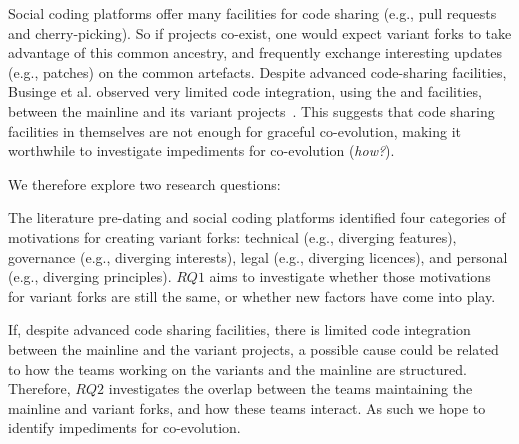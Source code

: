 Social coding platforms offer many facilities for code sharing (e.g., pull requests and cherry-picking).
So if projects co-exist, one would expect variant forks to take advantage of this common ancestry, and frequently exchange interesting updates (e.g., patches) on the common artefacts.
Despite advanced code-sharing facilities, Businge et al. observed very limited code integration, using the \git and \gh facilities, between the mainline and its variant projects~\cite{businge:emse:2021}.
This suggests that code sharing facilities in themselves are not enough for graceful co-evolution, making it worthwhile to investigate impediments for co-evolution (\textit{how?}).


\noindent
We therefore explore two research questions:

\textit{\textbf{\RQOne}}
The literature pre-dating \git and social coding platforms identified four categories of motivations for creating variant forks: technical (e.g., diverging features), governance (e.g., diverging interests), legal (e.g., diverging licences), and personal (e.g., diverging principles).
$RQ1$ aims to investigate whether those motivations for variant forks are still the same, or whether new factors have come into play. 

\textit{\textbf{\RQTwo}}
If, despite advanced code sharing facilities, there is limited code integration between the mainline and the variant projects, a possible cause could be related to how the teams working on the variants and the mainline are structured.
Therefore, $RQ2$ investigates the overlap between the teams maintaining the mainline and variant forks, and how these teams interact.
As such we hope to identify impediments for co-evolution.


